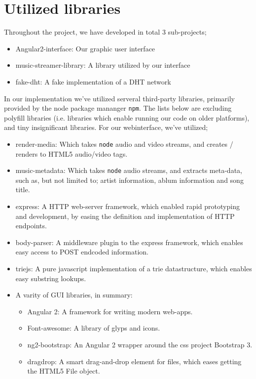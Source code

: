 \section{Utilized libraries}
\label{sec:libraries}
Throughout the project, we have developed in total 3 sub-projects;
\begin{itemize}
\item Angular2-interface: Our graphic user interface
\item music-streamer-library: A library utilized by our interface
\item fake-dht: A fake implementation of a DHT network
\end{itemize}
In our implementation we've utilized serveral third-party libraries, primarily
provided by the node package mananger \verb|npm|. The lists below are excluding
polyfill libraries (i.e. libraries which enable running our code on older
platforms), and tiny insignificant libraries.
\newline\newline
For our webinterface, we've utilized;
\begin{itemize}
\item render-media: Which takes \verb|node| audio and video streams, and
        creates / renders to HTML5 audio/video tags.
\item music-metadata: Which takes \verb|node| audio streams, and extracts
        meta-data, such as, but not limited to; artist information, ablum 
        information and song title.
\item express: A HTTP web-server framework, which enabled rapid prototyping and
        development, by easing the definition and implementation of HTTP endpoints.
\item body-parser: A middleware plugin to the express framework, which enables 
        easy access to POST endcoded information.
\item triejs: A pure javascript implementation of a trie datastructure, which 
        enables easy substring lookups.
\item A varity of GUI libraries, in summary:
    \begin{itemize}
    \item Angular 2: A framework for writing modern web-apps.
    \item Font-awesome: A library of glyps and icons.
    \item ng2-bootstrap: An Angular 2 wrapper around the css project Bootstrap 3.
    \item dragdrop: A smart drag-and-drop element for files, which eases getting
            the HTML5 File object.
    \end{itemize}
\end{itemize}
